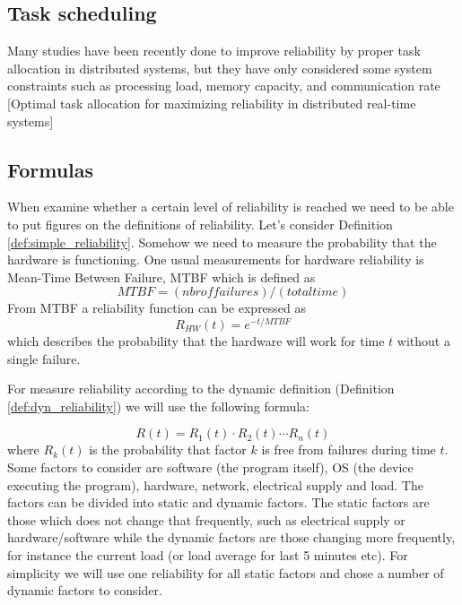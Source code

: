 \documentclass{cslthse-msc}
\begin{document}
\subsection{Task scheduling}

Many studies have been recently done to improve reliability by proper task allocation in distributed systems, but they have only considered some system constraints such as processing load, memory capacity, and communication rate [Optimal task allocation for maximizing reliability in distributed real-time systems]



\subsection{Formulas}
When examine whether a certain level of reliability is reached we need to be able to put figures on the definitions of reliability. Let's consider Definition \ref{def:simple_reliability}. Somehow we need to measure the probability that the hardware is functioning. One usual measurements for hardware reliability is Mean-Time Between Failure, MTBF which is defined as 
\begin{equation} \label{eq:MTBF}
MTBF = (nbr  of  failures) / (total time)
\end{equation}
From MTBF a reliability function can be expressed as 
\begin{equation} \label{eq:HW_reliability}
R_{HW}(t) = e^{-t/MTBF}
\end{equation}
which describes the probability that the hardware will work for time $t$ without a single failure.

For measure reliability according to the dynamic definition (Definition \ref{def:dyn_reliability}) we will use the following formula:




\begin{equation} \label{eq:overall_reliability}
R(t) = R_{1}(t) \cdot R_{2}(t) \cdots R_{n}(t)
\end{equation}
where $R_{k}(t)$ is the probability that factor $k$ is free from failures during time $t$. Some factors to consider are software (the program itself), OS (the device executing the program), hardware, network, electrical supply and load. The factors can be divided into static and dynamic factors. The static factors are those which does not change that frequently, such as electrical supply or hardware/software while the dynamic factors are those changing more frequently, for instance the current load (or load average for last 5 minutes etc). For simplicity we will use one reliability for all static factors and chose a number of dynamic factors to consider.
\end{document}
